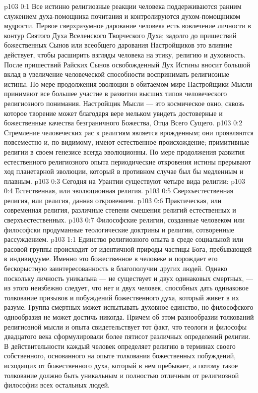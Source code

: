 \author{Мелхиседек}
\vs p103 0:1 Все истинно религиозные реакции человека поддерживаются ранним служением духа\hyp{}помощника почитания и контролируются духом\hyp{}помощником мудрости. Первое сверхразумное дарование человека есть вовлечение личности в контур Святого Духа Вселенского Творческого Духа; задолго до пришествий божественных Сынов или всеобщего дарования Настройщиков это влияние действует, чтобы расширить взгляды человека на этику, религию и духовность. После пришествий Райских Сынов освобожденный Дух Истины вносит большой вклад в увеличение человеческой способности воспринимать религиозные истины. По мере продолжения эволюции в обитаемом мире Настройщики Мысли принимают все большее участие в развитии высших типов человеческого религиозного понимания. Настройщик Мысли --- это космическое окно, сквозь которое творение может благодаря вере мельком увидеть достоверные и божественные качества безграничного Божества, Отца Всего Сущего.
\vs p103 0:2 Стремление человеческих рас к религиям является врожденным; они проявляются повсеместно и, по\hyp{}видимому, имеют естественное происхождение; примитивные религии в своем генезисе всегда эволюционны. По мере продолжения развития естественного религиозного опыта периодические откровения истины прерывают ход планетарной эволюции, который в противном случае был бы медленным и плавным.
\vs p103 0:3 \pc Сегодня на Урантии существуют четыре вида религии:
\vs p103 0:4 \bibnobreakspace Естественная, или эволюционная религия.
\vs p103 0:5 \bibnobreakspace Сверхъестественная религия, или религия, данная откровением.
\vs p103 0:6 \bibnobreakspace Практическая, или современная религия, различные степени смешения религий естественных и сверхъестественных.
\vs p103 0:7 \bibnobreakspace Философские религии, созданные человеком или философски продуманные теологические доктрины и религии, сотворенные рассуждением.
\vs p103 1:1 Единство религиозного опыта в среде социальной или расовой группы происходит от идентичной природы частицы Бога, пребывающей в индивидууме. Именно это божественное в человеке и порождает его бескорыстную заинтересованность в благополучии других людей. Однако поскольку личность уникальна --- не существует и двух одинаковых смертных, --- из этого неизбежно следует, что нет и двух человек, способных дать одинаковое толкование призывов и побуждений божественного духа, который живет в их разуме. Группа смертных может испытывать духовное единство, но философского однообразия не может достичь никогда. Причем об этом разнообразии толкований религиозной мысли и опыта свидетельствует тот факт, что теологи и философы двадцатого века сформулировали более пятисот различных определений религии. В действительности каждый человек определяет религию в терминах своего собственного, основанного на опыте толкования божественных побуждений, исходящих от божественного духа, который в нем пребывает, а потому такое толкование должно быть уникальным и полностью отличным от религиозной философии всех остальных людей.
